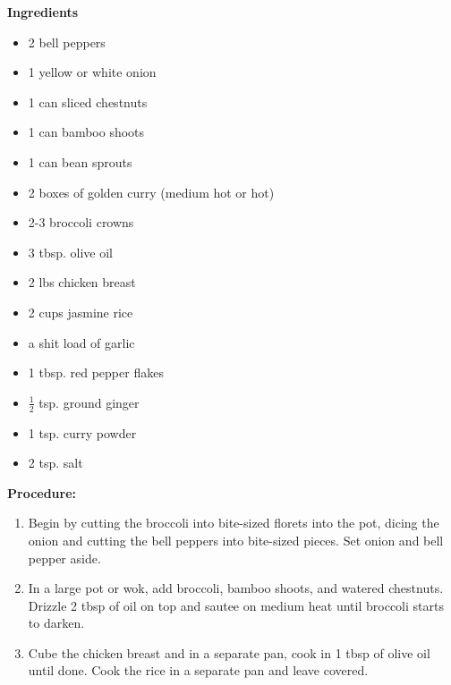 
    




\bigskip

\bigskip

\begin{multicols}{2}
\textbf{Ingredients}
\begin{itemize}
\item 2 bell peppers 

\item 1 yellow or white onion
\item 1 can sliced chestnuts
\item 1 can bamboo shoots
\item 1 can bean sprouts 
\item 2 boxes of golden curry (medium hot or hot)
\item 2-3 broccoli crowns
\item 3 tbsp. olive oil
\item 2 lbs chicken breast 
\item 2 cups jasmine rice
\item a shit load of garlic
\item 1 tbsp. red pepper flakes
\item $\frac{1}{2}$ tsp. ground ginger
\item 1 tsp. curry powder 
\item 2 tsp. salt

\end{itemize}


\columnbreak
\textbf{Procedure:}
\medskip


\begin{enumerate}
\item 
Begin by cutting the broccoli into bite-sized florets into the pot, dicing the onion and cutting the bell peppers into bite-sized pieces. Set onion and bell pepper aside. 

\item In a large pot or wok, add broccoli, bamboo shoots, and watered chestnuts. Drizzle 2 tbsp of oil on top and sautee on medium heat until broccoli starts to darken.


\medskip
\item Cube the chicken breast and in a separate pan, cook in 1 tbsp of olive oil until done. Cook the rice in a separate pan and leave covered.
\medskip


\end{enumerate}
\end{multicols}
